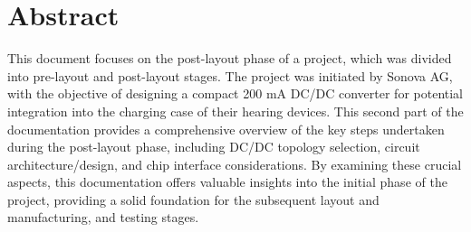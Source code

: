 \section*{\huge Abstract}
\label{chap:abstract}
This document focuses on the post-layout phase of a project, which was divided into pre-layout and post-layout stages. The project was initiated by Sonova AG, with the objective of designing a compact 200 mA DC/DC converter for potential integration into the charging case of their hearing devices. This second part of the documentation provides a comprehensive overview of the key steps undertaken during the post-layout phase, including DC/DC topology selection, circuit architecture/design, and chip interface considerations. By examining these crucial aspects, this documentation offers valuable insights into the initial phase of the project, providing a solid foundation for the subsequent layout and manufacturing, and testing stages.
\clearpage
